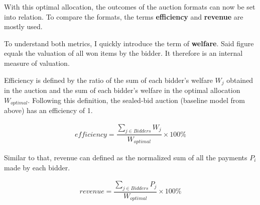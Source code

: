 With this optimal allocation, the outcomes of the auction formats can now be set into relation. To compare the formats, the terms \textbf{efficiency} and \textbf{revenue} are mostly used. 

To understand both metrics, I quickly introduce the term of \textbf{welfare}. Said figure equals the valuation of all won items by the bidder. It therefore is an internal measure of valuation.

Efficiency is defined by the ratio of the sum of each bidder's welfare $ W_{j} $ obtained in the auction and the sum of each bidder's welfare in the optimal allocation $ W_{optimal} $. Following this definition, the sealed-bid auction (baseline model from above) has an efficiency of 1. 

\begin{align}
efficiency = \dfrac{\sum_{j \in Bidders} W_{j}}{W_{optimal}} \times 100\%  
\label{eq:efficiency}
\end{align}

Similar to that, revenue can defined as the normalized sum of all the payments $ P_i $ made by each bidder.

\begin{align}
revenue = \dfrac{\sum_{j \in Bidders} P_{j}}{W_{optimal}} \times 100\%   
\label{eq:revenue}
\end{align}


